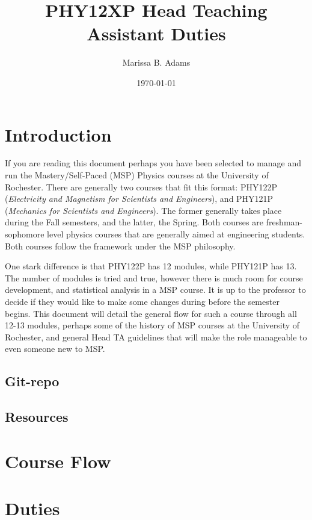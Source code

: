 \documentclass[12pt]{article}
\title{PHY12XP Head Teaching Assistant Duties}
\author{Marissa B. Adams}
\date{\today}
\begin{document}
\maketitle

\thispagestyle{fancy}

\section{Introduction}

\indent If you are reading this document perhaps you have been selected to manage and run the Mastery/Self-Paced (MSP) Physics courses at the University of Rochester. There are generally two courses that fit this format: PHY122P (\emph{Electricity and Magnetism for Scientists and Engineers}), and PHY121P (\emph{Mechanics for Scientists and Engineers}). The former generally takes place during the Fall semesters, and the latter, the Spring. Both courses are freshman-sophomore level physics courses that are generally aimed at engineering students. Both courses follow the framework under the MSP philosophy. 

\indent One stark difference is that PHY122P has 12 modules, while PHY121P has 13. The number of modules is tried and true, however there is much room for course development, and statistical analysis in a MSP course. It is up to the professor to decide if they would like to make some changes during before the semester begins. This document will detail the general flow for such a course through all 12-13 modules, perhaps some of the history of MSP courses at the University of Rochester, and general Head TA guidelines that will make the role manageable to even someone new to MSP. 
 

\subsection{Git-repo}

\subsection{Resources}

\section{Course Flow}

\section{Duties}
\end{document}
